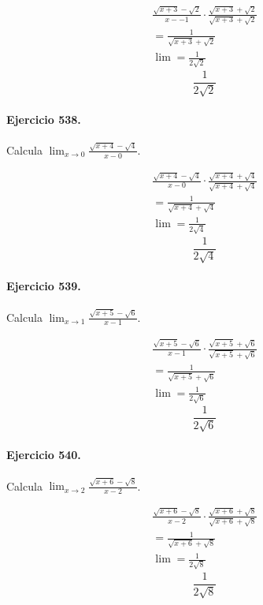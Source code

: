 \documentclass[11pt,a4paper]{article}
\begin{document}
\[
\begin{aligned}
\frac{\sqrt{x+3}-\sqrt{2}}{x--1}\cdot \frac{\sqrt{x+3}+\sqrt{2}}{\sqrt{x+3}+\sqrt{2}}\\
=\frac{1}{\sqrt{x+3}+\sqrt{2}}\\
\lim=\frac{1}{2\sqrt{2}}
\end{aligned}
\]
\[\boxed{\frac{1}{2\sqrt{2}}}\]


\paragraph{Ejercicio 538.} Calcula $\displaystyle\lim_{x\to 0}\frac{\sqrt{x+4}-\sqrt{4}}{x-0}$.

\[
\begin{aligned}
\frac{\sqrt{x+4}-\sqrt{4}}{x-0}\cdot \frac{\sqrt{x+4}+\sqrt{4}}{\sqrt{x+4}+\sqrt{4}}\\
=\frac{1}{\sqrt{x+4}+\sqrt{4}}\\
\lim=\frac{1}{2\sqrt{4}}
\end{aligned}
\]
\[\boxed{\frac{1}{2\sqrt{4}}}\]


\paragraph{Ejercicio 539.} Calcula $\displaystyle\lim_{x\to 1}\frac{\sqrt{x+5}-\sqrt{6}}{x-1}$.

\[
\begin{aligned}
\frac{\sqrt{x+5}-\sqrt{6}}{x-1}\cdot \frac{\sqrt{x+5}+\sqrt{6}}{\sqrt{x+5}+\sqrt{6}}\\
=\frac{1}{\sqrt{x+5}+\sqrt{6}}\\
\lim=\frac{1}{2\sqrt{6}}
\end{aligned}
\]
\[\boxed{\frac{1}{2\sqrt{6}}}\]


\paragraph{Ejercicio 540.} Calcula $\displaystyle\lim_{x\to 2}\frac{\sqrt{x+6}-\sqrt{8}}{x-2}$.

\[
\begin{aligned}
\frac{\sqrt{x+6}-\sqrt{8}}{x-2}\cdot \frac{\sqrt{x+6}+\sqrt{8}}{\sqrt{x+6}+\sqrt{8}}\\
=\frac{1}{\sqrt{x+6}+\sqrt{8}}\\
\lim=\frac{1}{2\sqrt{8}}
\end{aligned}
\]
\[\boxed{\frac{1}{2\sqrt{8}}}\]


\newpage
\end{document}
